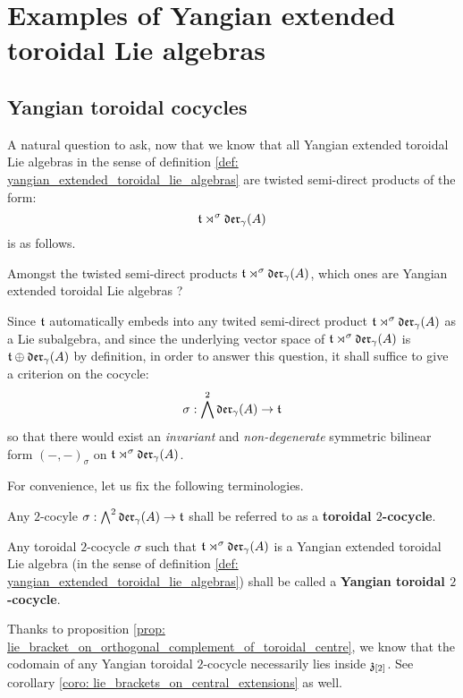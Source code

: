 \section{Examples of Yangian extended toroidal Lie algebras}
    \subsection{Yangian toroidal cocycles}
        A natural question to ask, now that we know that all Yangian extended toroidal Lie algebras in the sense of definition \ref{def: yangian_extended_toroidal_lie_algebras} are twisted semi-direct products of the form:
            $$\mathfrak{t} \rtimes^{\sigma} \mathfrak{der}_{\gamma}(A)$$
        is as follows.
        \begin{question}
            Amongst the twisted semi-direct products $\mathfrak{t} \rtimes^{\sigma} \mathfrak{der}_{\gamma}(A)$, which ones are Yangian extended toroidal Lie algebras ? 
        \end{question}
        Since $\mathfrak{t}$ automatically embeds into any twited semi-direct product $\mathfrak{t} \rtimes^{\sigma} \mathfrak{der}_{\gamma}(A)$ as a Lie subalgebra, and since the underlying vector space of $\mathfrak{t} \rtimes^{\sigma} \mathfrak{der}_{\gamma}(A)$ is $\mathfrak{t} \oplus \mathfrak{der}_{\gamma}(A)$ by definition, in order to answer this question, it shall suffice to give a criterion on the cocycle:
            $$\sigma: \bigwedge^2 \mathfrak{der}_{\gamma}(A) \to \mathfrak{t}$$
        so that there would exist an \textit{invariant} and \textit{non-degenerate} symmetric bilinear form $(-, -)_{\sigma}$ on $\mathfrak{t} \rtimes^{\sigma} \mathfrak{der}_{\gamma}(A)$.

        For convenience, let us fix the following terminologies.
        \begin{definition} \label{def: yangian_toroidal_cocycles}
            Any $2$-cocyle $\sigma: \bigwedge^2 \mathfrak{der}_{\gamma}(A) \to \mathfrak{t}$ shall be referred to as a \textbf{toroidal $2$-cocycle}.
            
            Any toroidal $2$-cocycle $\sigma$ such that $\mathfrak{t} \rtimes^{\sigma} \mathfrak{der}_{\gamma}(A)$ is a Yangian extended toroidal Lie algebra (in the sense of definition \ref{def: yangian_extended_toroidal_lie_algebras}) shall be called a \textbf{Yangian toroidal $2$-cocycle}.
        \end{definition}
        \begin{remark}
            Thanks to proposition \ref{prop: lie_bracket_on_orthogonal_complement_of_toroidal_centre}, we know that the codomain of any Yangian toroidal $2$-cocycle necessarily lies inside $\mathfrak{z}_{[2]}$. See corollary \ref{coro: lie_brackets_on_central_extensions} as well.
        \end{remark}

